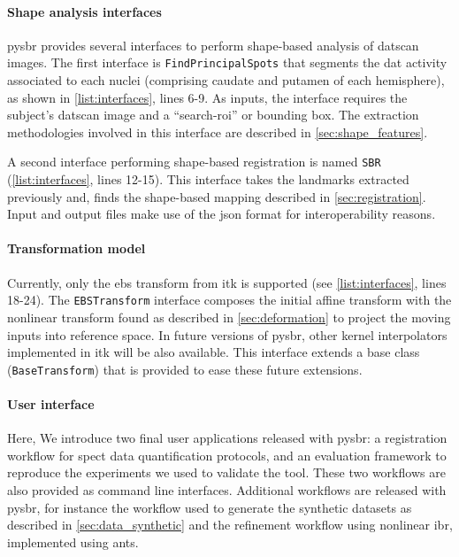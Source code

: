 \documentclass{frontiers}
\begin{document}
\paragraph{Shape analysis interfaces}
\label{sec:shapeanalysis}

\Gls*{pysbr} provides several interfaces to perform shape-based analysis of \gls*{datscan}
  images.
The first interface is \texttt{FindPrincipalSpots} that segments the \acrlong*{dat} activity
  associated to each nuclei (comprising caudate and putamen of each hemisphere),
  as shown in \autoref{list:interfaces}, lines 6-9.
As inputs, the interface requires the subject's \gls*{datscan} image and a ``search-\gls*{roi}'' or
  bounding box.
The extraction methodologies involved in this interface are described in \autoref{sec:shape_features}.

A second interface performing shape-based registration is named \texttt{SBR}
  (\autoref{list:interfaces}, lines 12-15).
This interface takes the landmarks extracted previously and, finds
  the shape-based mapping described in \autoref{sec:registration}.
Input and output files make use of the \gls*{json} format
  for interoperability reasons.

\paragraph{Transformation model} %
Currently, only the \gls*{ebs} transform from \gls*{itk} is supported
  (see \autoref{list:interfaces}, lines 18-24).
The \texttt{EBSTransform} interface composes the initial affine transform
  with the nonlinear transform found as described in \autoref{sec:deformation}
  to project the moving inputs into reference space.
In future versions of \gls*{pysbr}, other kernel interpolators implemented in \gls*{itk} 
  will be also available.
This interface extends a base class (\texttt{BaseTransform}) that is provided to
  ease these future extensions.


\paragraph{User interface}
\label{sec:user_interface}

Here, We introduce two final user
  applications released with \gls*{pysbr}: a registration workflow for
  \gls*{spect} data quantification protocols, and an evaluation framework
  to reproduce the experiments we used to validate the tool.
These two workflows are also provided as command line interfaces.
Additional workflows are released with \gls*{pysbr}, for instance
  the workflow used to generate the synthetic datasets as described
  in \autoref{sec:data_synthetic} and the refinement workflow using
  nonlinear \gls*{ibr}, implemented using \gls*{ants}.
\end{document}
